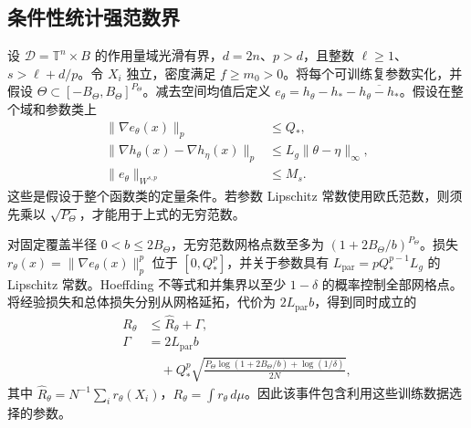\subsection{条件性统计强范数界}
设 $\mathcal D=\mathbb T^n\times B$ 的作用量域光滑有界，$d=2n$、$p>d$，且整数 $\ell\ge1$、$s>\ell+d/p$。令 $X_i$ 独立，密度满足 $f\ge m_0>0$。将每个可训练复参数实化，并假设 $\Theta\subset[-B_\Theta,B_\Theta]^{P_\Theta}$。减去空间均值后定义 $e_\theta=h_\theta-h_*-\overline{h_\theta-h_*}$。假设在整个域和参数类上
\begin{align}
 \|\nabla e_\theta(x)\|_p&\le Q_*,\nonumber\\
 \|\nabla h_\theta(x)-\nabla h_\eta(x)\|_p
 &\le L_g\|\theta-\eta\|_\infty,\nonumber\\
 \|e_\theta\|_{W^{s,p}}&\le M_s.
 \label{eq:supp-learn-stat-assumptions}
\end{align}
这些是假设于整个函数类的定量条件。若参数 Lipschitz 常数使用欧氏范数，则须先乘以 $\sqrt{P_\Theta}$，才能用于上式的无穷范数。

对固定覆盖半径 $0<b\le2B_\Theta$，无穷范数网格点数至多为 $(1+2B_\Theta/b)^{P_\Theta}$。损失 $r_\theta(x)=\|\nabla e_\theta(x)\|_p^p$ 位于 $[0,Q_*^p]$，并关于参数具有 $L_{\mathrm{par}}=pQ_*^{p-1}L_g$ 的 Lipschitz 常数。Hoeffding 不等式和并集界以至少 $1-\delta$ 的概率控制全部网格点。将经验损失和总体损失分别从网格延拓，代价为 $2L_{\mathrm{par}}b$，得到同时成立的
\begin{equation}
 \begin{aligned}
 R_\theta&\le\widehat R_\theta+\Gamma,\\
 \Gamma&=2L_{\mathrm{par}}b\\
 &\quad+Q_*^p\sqrt{\frac{P_\Theta\log(1+2B_\Theta/b)+\log(1/\delta)}{2N}},
 \end{aligned}
 \label{eq:supp-learn-covering}
\end{equation}
其中 $\widehat R_\theta=N^{-1}\sum_i r_\theta(X_i)$，$R_\theta=\int r_\theta\,d\mu$。因此该事件包含利用这些训练数据选择的参数。

